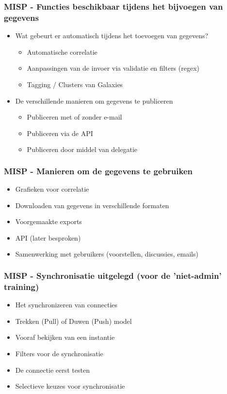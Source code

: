 \begin{frame}
    \frametitle{MISP - Functies beschikbaar tijdens het bijvoegen van gegevens}
    \begin{itemize}
        \item Wat gebeurt er automatisch tijdens het toevoegen van gegevens?
        \begin{itemize}
            \item Automatische correlatie
            \item Aanpassingen van de invoer via validatie en filters (regex)
            \item Tagging / Clusters van Galaxies
        \end{itemize}
        \item De verschillende manieren om gegevens te publiceren
        \begin{itemize}
            \item Publiceren met of zonder e-mail
            \item Publiceren via de API
            \item Publiceren door middel van delegatie
        \end{itemize}
    \end{itemize}
\end{frame}

\begin{frame}
    \frametitle{MISP - Manieren om de gegevens te gebruiken}
    \begin{itemize}
        \item Grafieken voor correlatie
        \item Downloaden van gegevens in verschillende formaten
        \item Voorgemaakte exports
        \item API (later besproken)
        \item Samenwerking met gebruikers (voorstellen, discussies, emails)
    \end{itemize}
\end{frame}

\begin{frame}
    \frametitle{MISP - Synchronisatie uitgelegd (voor de 'niet-admin' training)}
    \begin{itemize}
        \item Het synchronizeren van connecties
        \item Trekken (Pull) of Duwen (Push) model
        \item Vooraf bekijken van een instantie
        \item Filters voor de synchronisatie
        \item De connectie eerst testen
        \item Selectieve keuzes voor synchronisatie
    \end{itemize}
\end{frame}

